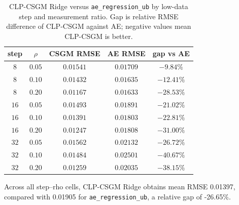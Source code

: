 \begin{table}[t]
  \centering
  \caption{CLP-CSGM Ridge versus \texttt{ae\_regression\_ub} by low-data step and
  measurement ratio. Gap is relative RMSE difference of CLP-CSGM against AE; negative
  values mean CLP-CSGM is better.}
  \label{tab:csgm_m2_vs_ae}
  \small
  \begin{tabular}{@{}ccccc@{}}
    \toprule
    step & $\rho$ & CSGM RMSE & AE RMSE & gap vs AE \\
    \midrule
    $8$ & $0.05$ & $0.01541$ & $0.01709$ & $-9.84\%$ \\
    $8$ & $0.10$ & $0.01432$ & $0.01635$ & $-12.41\%$ \\
    $8$ & $0.20$ & $0.01167$ & $0.01633$ & $-28.53\%$ \\
    $16$ & $0.05$ & $0.01493$ & $0.01891$ & $-21.02\%$ \\
    $16$ & $0.10$ & $0.01391$ & $0.01803$ & $-22.81\%$ \\
    $16$ & $0.20$ & $0.01247$ & $0.01808$ & $-31.00\%$ \\
    $32$ & $0.05$ & $0.01562$ & $0.02132$ & $-26.72\%$ \\
    $32$ & $0.10$ & $0.01484$ & $0.02501$ & $-40.67\%$ \\
    $32$ & $0.20$ & $0.01259$ & $0.02035$ & $-38.15\%$ \\
    \bottomrule
  \end{tabular}
\end{table}

Across all step--rho cells, CLP-CSGM Ridge obtains mean RMSE 0.01397,
compared with 0.01905 for
\texttt{ae\_regression\_ub}, a relative gap of -26.65\%.
